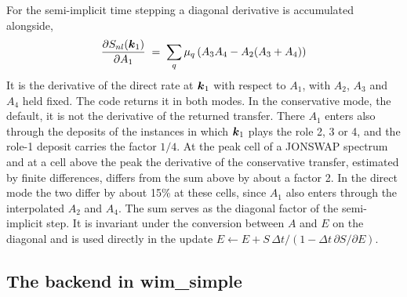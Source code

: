 \documentclass[12pt]{article}
\newcommand{\beq}  { \begin{eqnarray} }
\newcommand{\eeq}  { \end{eqnarray}}
\renewcommand{\v}[1]{{\mbox{\boldmath$ #1 $}}}  %
\newcommand{\p}{{\partial}}
\newcommand{\lk}{\left(}
\newcommand{\rk}{\right)}
\begin{document}
For the semi-implicit time stepping a diagonal derivative is accumulated
alongside,
\beq
 \frac{\p S_{nl}(\v k_1)}{\p A_1} \;=\;
 \sum_q \mu_q \lk A_3 A_4 - A_2 (A_3 + A_4) \rk
\eeq
It is the derivative of the direct rate at $\v k_1$ with respect to $A_1$,
with $A_2$, $A_3$ and $A_4$ held fixed.
The code returns it in both modes.
In the conservative mode, the default, it is not the derivative of the
returned transfer.
There $A_1$ enters also through the deposits of the instances in which
$\v k_1$ plays the role 2, 3 or 4, and the role-1 deposit carries the
factor $1/4$.
At the peak cell of a JONSWAP spectrum and at a cell above the peak the
derivative of the conservative transfer, estimated by finite differences,
differs from the sum above by about a factor 2.
In the direct mode the two differ by about 15\% at these cells, since
$A_1$ also enters through the interpolated $A_2$ and $A_4$.
The sum serves as the diagonal factor of the semi-implicit step.
It is invariant under the conversion between $A$ and $E$ on the diagonal
and is used directly in the update
$E \leftarrow E + S\, \Delta t / (1 - \Delta t\, \p S/\p E)$.

\subsection*{The backend in wim\_simple}
\end{document}
